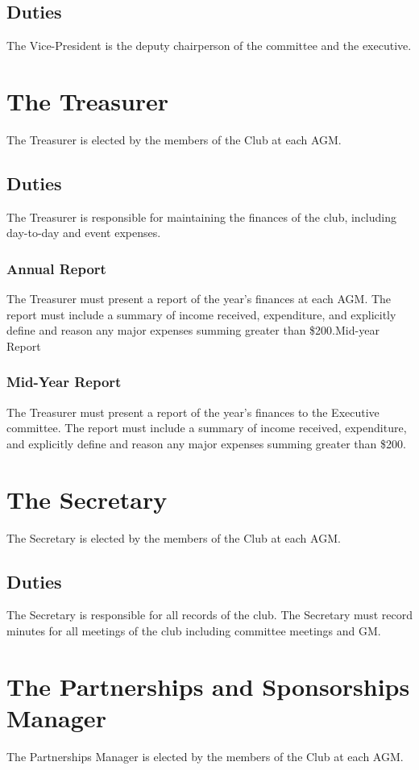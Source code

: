 \documentclass[11pt]{article}
\begin{document}
\subsection{Duties}
The Vice-President is the deputy chairperson of the committee and the executive.

\section{The Treasurer}
The Treasurer is elected by the members of the Club at each AGM.
\subsection{Duties}
The Treasurer is responsible for maintaining the finances of the club, including day-to-day and event expenses. 
\subsubsection{Annual Report}
The Treasurer must present a report of the year’s finances at each AGM. The report must include a summary of income received, expenditure, and explicitly define and reason any major expenses summing greater than \$200.Mid-year Report
\subsubsection{Mid-Year Report}
The Treasurer must present a report of the year’s finances to the Executive committee. The report must include a summary of income received, expenditure, and explicitly define and reason any major expenses summing greater than \$200.

\section{The Secretary}
The Secretary is elected by the members of the Club at each AGM.
\subsection{Duties}
The Secretary is responsible for all records of the club. The Secretary must record minutes for all meetings of the club including committee meetings and GM.

\section{The Partnerships and Sponsorships Manager}
The Partnerships Manager is elected by the members of the Club at each AGM.
\end{document}
